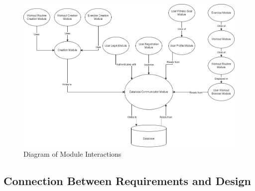 \documentclass[12pt, titlepage]{article}
\begin{document}
	\begin{figure}[H]
		\centering
		\includegraphics[width=\linewidth,keepaspectratio]{component_diagram}
    \caption{Diagram of Module Interactions}
	\end{figure}
	
	\subsection{Connection Between Requirements and Design} \label{SecConnection}
	
\end{document}
